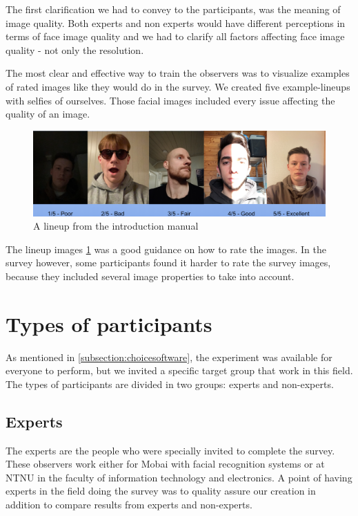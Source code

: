 The first clarification we had to convey to the participants, was the meaning of image quality. Both experts and non experts would have different perceptions in terms of face image quality and we had to clarify all factors affecting face image quality - not only the resolution. 

The most clear and effective way to train the observers was to visualize examples of rated images like they would do in the survey. We created five example-lineups with selfies of ourselves. Those facial images included every issue affecting the quality of an image. 

\begin{figure}[h]
    \centering
    \includegraphics[scale = 0.23]{figures/Example-lineup.png}
    \caption{A lineup from the introduction manual}
    \label{fig:example-manual}
\end{figure}

The lineup images \ref{fig:example-manual} was a good guidance on how to rate the images. In the survey however, some participants found it harder to rate the survey images, because they included several image properties to take into account. 

\section{Types of participants}
As mentioned in \ref{subsection:choicesoftware}, the experiment was available for everyone to perform, but we invited a specific target group that work in this field. The types of participants are divided in two groups: experts and non-experts.

\subsection*{Experts}
The experts are the people who were specially invited to complete the survey. These observers work either for Mobai with facial recognition systems or at NTNU in the faculty of information technology and electronics. A point of having experts in the field doing the survey was to quality assure our creation in addition to compare results from experts and non-experts. 

